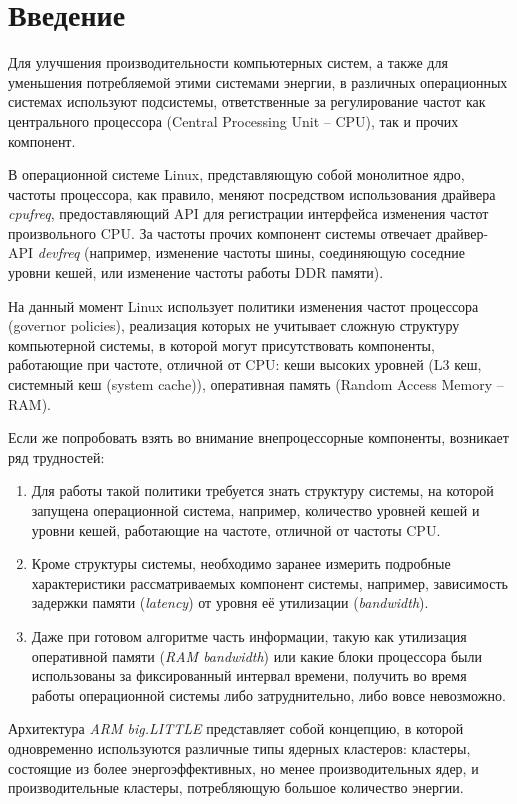 \section{Введение}
\label{sec:Section0} 

Для улучшения производительности компьютерных систем, а также для уменьшения потребляемой
этими системами энергии, в различных операционных системах используют подсистемы,
ответственные за регулирование частот как центрального процессора (Central Processing Unit -- CPU),
так и прочих компонент.

В операционной системе Linux, представляющую собой монолитное ядро, частоты процессора,
как правило, меняют посредством использования драйвера \textit{cpufreq}, предоставляющий
API для регистрации интерфейса изменения частот произвольного CPU. За частоты прочих компонент
системы отвечает драйвер-API \textit{devfreq} (например, изменение частоты шины, соединяющую
соседние уровни кешей, или изменение частоты работы DDR памяти).

На данный момент Linux использует политики изменения частот процессора (governor policies),
реализация которых не учитывает сложную структуру компьютерной системы, в которой могут
присутствовать компоненты, работающие при частоте, отличной от CPU: кеши высоких уровней
(L3 кеш, системный кеш (system cache)), оперативная память (Random Access Memory -- RAM).

Если же попробовать взять во внимание внепроцессорные компоненты, возникает ряд трудностей:
\begin{enumerate}
    \item Для работы такой политики требуется знать структуру системы, на которой
    запущена операционной система, например, количество уровней кешей и уровни кешей, работающие
    на частоте, отличной от частоты CPU.
    \item Кроме структуры системы, необходимо заранее измерить подробные характеристики
    рассматриваемых компонент системы, например, зависимость задержки памяти (\textit{latency})
    от уровня её утилизации (\textit{bandwidth}).
    \item Даже при готовом алгоритме часть информации, такую как утилизация оперативной памяти
    (\textit{RAM bandwidth}) или какие блоки процессора были использованы за фиксированный
    интервал времени, получить во время работы операционной системы либо затруднительно,
    либо вовсе невозможно.
\end{enumerate}

Архитектура \textit{ARM big.LITTLE} представляет собой концепцию, в которой одновременно
используются различные типы ядерных кластеров: кластеры, состоящие из более энергоэффективных,
но менее производительных ядер, и производительные кластеры, потребляющую большое количество
энергии.

